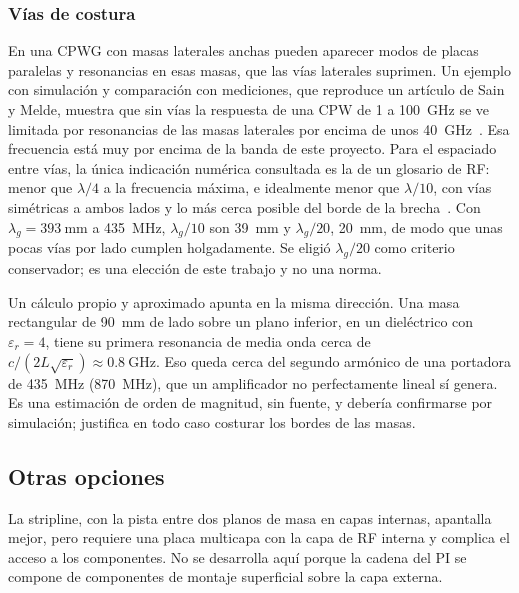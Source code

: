 \subsubsection{Vías de costura}

En una CPWG con masas laterales anchas pueden aparecer modos de placas paralelas y resonancias en esas masas, que las vías laterales suprimen. Un ejemplo con simulación y comparación con mediciones, que reproduce un artículo de Sain y Melde, muestra que sin vías la respuesta de una CPW de 1 a \SI{100}{\giga\hertz} se ve limitada por resonancias de las masas laterales por encima de unos \SI{40}{\giga\hertz}~\cite{flexcompute,sain15}. Esa frecuencia está muy por encima de la banda de este proyecto. Para el espaciado entre vías, la única indicación numérica consultada es la de un glosario de RF\@: menor que $\lambda/4$ a la frecuencia máxima, e idealmente menor que $\lambda/10$, con vías simétricas a ambos lados y lo más cerca posible del borde de la brecha~\cite{rfessentialscpwg}. Con $\lambda_g = \SI{393}{\milli\metre}$ a \SI{435}{\mega\hertz}, $\lambda_g/10$ son \SI{39}{\milli\metre} y $\lambda_g/20$, \SI{20}{\milli\metre}, de modo que unas pocas vías por lado cumplen holgadamente. Se eligió $\lambda_g/20$ como criterio conservador; es una elección de este trabajo y no una norma.

Un cálculo propio y aproximado apunta en la misma dirección. Una masa rectangular de \SI{90}{\milli\metre} de lado sobre un plano inferior, en un dieléctrico con $\varepsilon_r = 4$, tiene su primera resonancia de media onda cerca de $c/(2L\sqrt{\varepsilon_r}) \approx \SI{0,8}{\giga\hertz}$. Eso queda cerca del segundo armónico de una portadora de \SI{435}{\mega\hertz} (\SI{870}{\mega\hertz}), que un amplificador no perfectamente lineal sí genera. Es una estimación de orden de magnitud, sin fuente, y debería confirmarse por simulación; justifica en todo caso costurar los bordes de las masas.

\subsection{Otras opciones}\label{sec:layout-otras}

La stripline, con la pista entre dos planos de masa en capas internas, apantalla mejor, pero requiere una placa multicapa con la capa de RF interna y complica el acceso a los componentes. No se desarrolla aquí porque la cadena del PI se compone de componentes de montaje superficial sobre la capa externa. 


